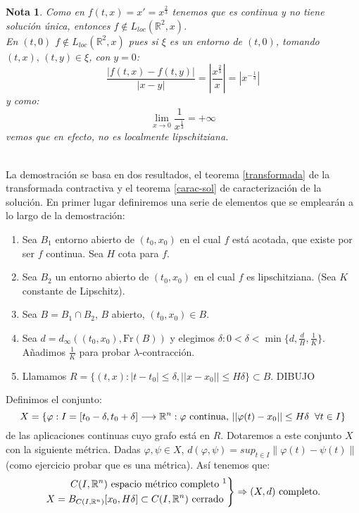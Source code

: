 \documentclass[11pt]{article}
\makeatletter
\theoremstyle{theorem-style}  %
\renewenvironment{proof}[1][\proofname]{\par
	\pushQED{\qed}%
	\normalfont \topsep6\p@\@plus6\p@\relax
	\list{}{%
		\settowidth{\leftmargin}{\quad:\hskip\labelsep}%
		\setlength{\labelwidth}{0pt}%
		\setlength{\itemindent}{-\leftmargin}%
	}%
	\item[\hskip\labelsep\itshape#1\@addpunct{:}]\ignorespaces
}{%
	\popQED\endlist\@endpefalse
}
\theoremstyle{definition-style}
\newtheorem*{note}{Nota} %
\theoremstyle{example-style}
\providecommand{\norm}[1]{\left\lVert#1\right\rVert} %
\providecommand{\abs}[1]{\left\lvert#1\right\rvert} %
\newenvironment{rcases}
{\left.\begin{aligned}}
	{\end{aligned}\right\rbrace}
\makeatother
\begin{document}
\begin{note}
	Como en $f(t, x) = x' = x^{\frac{2}{3}}$ tenemos que es continua y no tiene solución única, entonces $f \notin L_{loc}(\mathbb{R}^2,x)$. \\
	En $(t, 0)$ $f \notin L_{loc}(\mathbb{R}^2,x)$ pues si $\xi$ es un entorno de $(t, 0)$, tomando $(t, x), \, (t, y) \in \xi$, con $y=0$:
	\[\frac{\abs{f(t, x) - f(t, y)}}{\abs{x - y}} = \abs{\frac{x^{\frac{2}{3}}}{x}} = \abs{x^{-\frac{1}{3}}}\]
	y como:
	\[\lim\limits_{x \to 0} \frac{1}{x^{\frac{1}{3}}} = +\infty\] 
	vemos que en efecto, no es localmente lipschitziana.
\end{note}
\begin{proof}\ \\
	La demostración se basa en dos resultados, el teorema \ref{transformada} de la transformada contractiva y el teorema \ref{carac-sol} de caracterización de la solución. En primer lugar definiremos una serie de elementos que se emplearán a lo largo de la demostración:
	\begin{enumerate}
		\item Sea $ B_1 $  entorno abierto de $ (t_0,x_0) $ en el cual $ f $ está acotada, que existe por ser $ f $ continua. Sea $ H $ cota para $ f $.
		
		\item Sea $ B_2 $ un entorno abierto de $ (t_0,x_0) $ en el cual $ f $ es lipschitziana. (Sea $ K $ constante de Lipschitz).
		
		\item Sea $ B=B_1 \cap B_2 $, $ B $ abierto, $ (t_0,x_0) \in B$.
		
		\item Sea $ d=d_\infty((t_0,x_0),\text{Fr}(B)) $ y elegimos $ \delta : 0<\delta <\min \{d,\frac{d}{H},\frac{1}{K}\} $. Añadimos $ \frac{1}{K} $ para probar $ \lambda $-contracción.
		\item Llamamos $ R=\{(t,x) : |t-t_0|\leq \delta, ||x-x_0||\leq H\delta \}\subset B $.
		DIBUJO
	\end{enumerate}
	
	Definimos el conjunto:
	 \[X=\{\varphi : I=[t_0-\delta, t_0+\delta]\longrightarrow \mathbb{R}^n : \varphi \text{ continua, } ||\varphi(t)-x_0||\leq H \delta \hspace{0,2cm} \forall t \in I  \} \]
	de las aplicaciones continuas cuyo grafo está en $R$. Dotaremos a este conjunto $ X $ con la siguiente métrica. Dadas $\varphi, \psi \in X$, $d(\varphi, \psi) = sup_{t \in I} \norm{\varphi (t) - \psi (t)}$ (como ejercicio probar que es una métrica). Así tenemos que:\\
	\[\begin{rcases}
		C(I, \mathbb{R}^n) \text{ espacio métrico completo \footnotemark}\\
		X = B_{C(I, \mathbb{R}^n)} [x_0, H\delta] \subset C(I, \mathbb{R}^n) \text{ cerrado } \\
	\end{rcases} \Rightarrow (X, d) \text{ completo.}\]
	

\end{proof}
\end{document}
